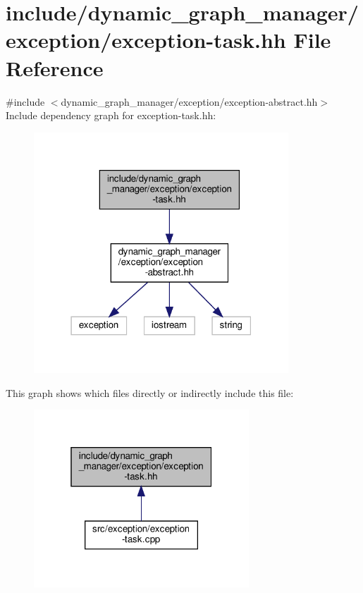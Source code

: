 \hypertarget{exception-task_8hh}{}\section{include/dynamic\+\_\+graph\+\_\+manager/exception/exception-\/task.hh File Reference}
\label{exception-task_8hh}
{\ttfamily \#include $<$dynamic\+\_\+graph\+\_\+manager/exception/exception-\/abstract.\+hh$>$}\newline
Include dependency graph for exception-\/task.hh\+:
\nopagebreak
\begin{figure}[H]
\begin{center}
\leavevmode
\includegraphics[width=271pt]{exception-task_8hh__incl}
\end{center}
\end{figure}
This graph shows which files directly or indirectly include this file\+:
\nopagebreak
\begin{figure}[H]
\begin{center}
\leavevmode
\includegraphics[width=229pt]{exception-task_8hh__dep__incl}
\end{center}
\end{figure}
